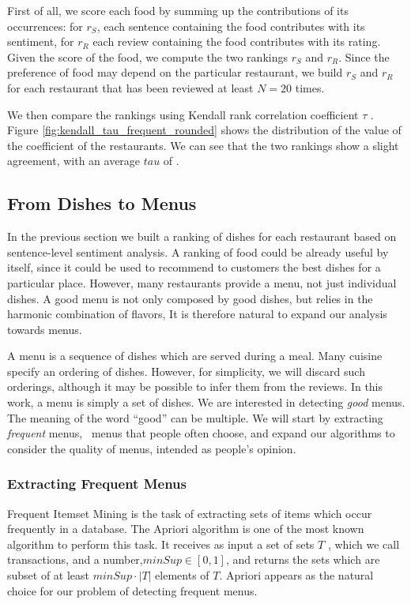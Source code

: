 First of all, we score each food by summing up the contributions of its occurrences: for $r_S$, each sentence containing the food contributes with its sentiment, for $r_R$ each review containing the food contributes with its rating.
Given the score of the food, we compute the two rankings $r_S$ and $r_R$.
Since the preference of food may depend on the particular restaurant, we build $r_S$ and $r_R$ for each restaurant that has been reviewed at least $N = 20$ times.

We then compare the rankings using Kendall rank correlation coefficient $\tau$ \cite{kendall1938new}. Figure \ref{fig:kendall_tau_frequent_rounded} shows the distribution of  the value of the coefficient of the restaurants. We can see that the two rankings show a slight agreement, with an average $tau$ of .


\subsection{From Dishes to Menus}
In the previous section we built a ranking of dishes for each restaurant based on sentence-level sentiment analysis. A ranking of food could be already useful by itself, since it could be used to recommend to customers the best dishes for a particular place. 
However, many restaurants provide a menu, not just individual dishes.
A good menu is not only composed by good dishes, but relies in the harmonic combination of flavors,
It is therefore natural to expand our analysis towards menus.

A menu is a sequence of dishes which are served during a meal. Many cuisine specify an ordering of dishes. However, for simplicity, we will discard such orderings, although it may be possible to infer them from the reviews.
In this work, a menu is simply a set of dishes. 
We are interested in detecting \emph{good} menus. The meaning of the word ``good'' can be multiple. 
We will start by extracting \emph{frequent} menus, \ie\ menus that people often choose, and expand our algorithms to consider the quality of menus, intended as people's opinion.

\subsubsection{Extracting Frequent Menus}
Frequent Itemset Mining is the task of extracting sets of items which occur frequently in a database. The Apriori algorithm \cite{agrawal1994fast} is one of the most known algorithm to perform this task.
It receives as input a set of sets $T$ , which we call transactions, and a number,$minSup \in [0,1]$, and returns the sets which are subset of at least $minSup \cdot |T|$ elements of $T$.
Apriori appears as the natural choice for our problem of detecting frequent menus. 

